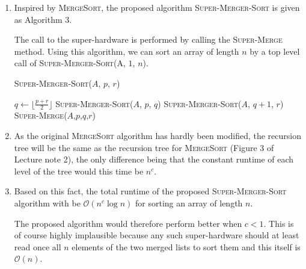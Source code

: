 \begin{enumerate}[label=(\alph*)]
\item Inspired by \textsc{MergeSort}, the proposed algorithm \textsc{Super-Merger-Sort} is given as Algorithm 3.

The call to the super-hardware is performed by calling the \textsc{Super-Merge} method. Using this algorithm, we can sort an array of length $n$ by a top level call of \textsc{Super-Merger-Sort}(A, $1$, $n$).

\begin{algorithm}[H]
\caption{\textsc{Super-Merger-Sort}($A$, $p$, $r$)}
\begin{algorithmic}[1]
\State $q \leftarrow \lfloor \frac{p+r}{2} \rfloor$
\State \textsc{Super-Merger-Sort}($A$, $p$, $q$)
\State \textsc{Super-Merger-Sort}($A$, $q+1$, $r$)
\State \textsc{Super-Merge}($A$,$p$,$q$,$r$)
\EndIf
\end{algorithmic}
\end{algorithm}

\item As the original \textsc{MergeSort} algorithm has hardly been modified, the recursion tree will be the same as the recursion tree for \textsc{MergeSort} (Figure 3 of Lecture note 2), the only difference being that the constant runtime of each level of the tree would this time be $n^c$.

\item Based on this fact, the total runtime of the proposed \textsc{Super-Merger-Sort} algorithm with be $\mathcal{O}(n^{c}\log n)$ for sorting an array of length $n$.

The proposed algorithm would therefore perform better when $c < 1$. This is of course highly implausible because any such super-hardware should at least read once all $n$ elements of the two merged lists to sort them and this itself is $\mathcal{O}(n)$.

\end{enumerate}
